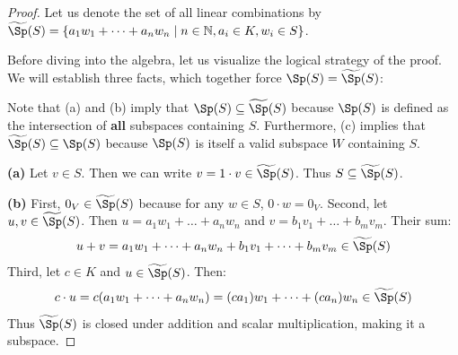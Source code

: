 \begin{proof}
Let us denote the set of all linear combinations by $\widetilde{\Sp}(S) = \{a_1 w_1 + \dots + a_n w_n \mid n \in \mathbb{N}, a_i \in K, w_i \in S\}$. 

Before diving into the algebra, let us visualize the logical strategy of the proof. We will establish three facts, which together force $\Sp(S) = \widetilde{\Sp}(S)$:

\begin{center}
\end{center}

Note that (a) and (b) imply that $\Sp(S) \subseteq \widetilde{\Sp}(S)$ because $\Sp(S)$ is defined as the intersection of \textbf{all} subspaces containing $S$. Furthermore, (c) implies that $\widetilde{\Sp}(S) \subseteq \Sp(S)$ because $\Sp(S)$ is itself a valid subspace $W$ containing $S$.

\textbf{(a)} Let $v \in S$. Then we can write $v = 1 \cdot v \in \widetilde{\Sp}(S)$. Thus $S \subseteq \widetilde{\Sp}(S)$.

\textbf{(b)} 
First, $0_V \in \widetilde{\Sp}(S)$ because for any $w \in S$, $0 \cdot w = 0_V$. 
Second, let $u, v \in \widetilde{\Sp}(S)$. Then $u = a_1 w_1 + \dots + a_n w_n$ and $v = b_1 v_1 + \dots + b_m v_m$. Their sum:
\[
u + v = a_1 w_1 + \dots + a_n w_n + b_1 v_1 + \dots + b_m v_m \in \widetilde{\Sp}(S)
\]
Third, let $c \in K$ and $u \in \widetilde{\Sp}(S)$. Then:
\[
c \cdot u = c(a_1 w_1 + \dots + a_n w_n) = (c a_1)w_1 + \dots + (c a_n)w_n \in \widetilde{\Sp}(S)
\]
Thus $\widetilde{\Sp}(S)$ is closed under addition and scalar multiplication, making it a subspace.


\end{proof}
